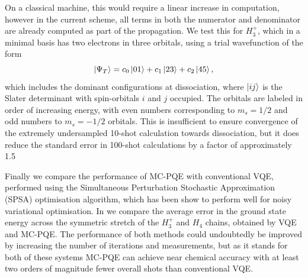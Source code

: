 \documentclass[%
 reprint,
 amsmath,amssymb,
 aps,
]{revtex4-2}
\begin{document}
{On a classical machine, this would require a linear increase in computation, however in the current scheme, all terms in both the numerator and denominator are already computed as part of the propagation. { We test this for $H_3^+$, which in a minimal basis has two electrons in three orbitals, using a trial wavefunction of the form 
\begin{equation}
    \ket{\Psi_T} = c_0\ket{01} + c_1\ket{23} + c_2\ket{45},
    \label{eq:trial_wfn}
\end{equation}
which includes the dominant configurations at dissociation, where $\ket{ij}$ is the Slater determinant with spin-orbitals $i$ and $j$ occupied. The orbitals are labeled in order of increasing energy, with even numbers corresponding to $m_s = 1/2$ and odd numbers to $m_s = -1/2$ orbitals. This is insufficient to ensure convergence of the extremely undersampled 10-shot calculation towards dissociation, but it does reduce the standard error in 100-shot calculations by a factor of approximately 1.5}

{ Finally we compare the performance of MC-PQE with conventional VQE, performed using the Simultaneous Perturbation Stochastic Approximation (SPSA) optimisation algorithm,\cite{Spall1992} which has been show to perform well for noisy variational optimisation.\cite{Bonet2023} In  we compare the average error in the ground state energy across the symmetric stretch of the $H_3^+$ and $H_4$ chains, obtained by VQE and MC-PQE. The performance of both methods could undoubtedly be improved by increasing the number of iterations and measurements, but as it stands for both of these systems MC-PQE can achieve  near chemical accuracy with at least two orders of magnitude fewer overall shots than conventional VQE.} 



}
\end{document}
